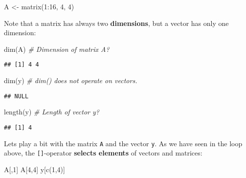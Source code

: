 \documentclass[
]{book}
\newenvironment{Shaded}{\begin{snugshade}}{\end{snugshade}}
\newcommand{\CommentTok}[1]{\textcolor[rgb]{0.56,0.35,0.01}{\textit{#1}}}
\newcommand{\DecValTok}[1]{\textcolor[rgb]{0.00,0.00,0.81}{#1}}
\newcommand{\FunctionTok}[1]{\textcolor[rgb]{0.00,0.00,0.00}{#1}}
\newcommand{\NormalTok}[1]{#1}
\newcommand{\OtherTok}[1]{\textcolor[rgb]{0.56,0.35,0.01}{#1}}
\newcommand{\SpecialCharTok}[1]{\textcolor[rgb]{0.00,0.00,0.00}{#1}}
\begin{document}
\begin{Shaded}
\begin{Highlighting}[]
\NormalTok{A }\OtherTok{\textless{}{-}} \FunctionTok{matrix}\NormalTok{(}\DecValTok{1}\SpecialCharTok{:}\DecValTok{16}\NormalTok{, }\DecValTok{4}\NormalTok{, }\DecValTok{4}\NormalTok{)}
\end{Highlighting}
\end{Shaded}

Note that a matrix has always two \textbf{dimensions}, but a vector has only one dimension:

\begin{Shaded}
\begin{Highlighting}[]
\FunctionTok{dim}\NormalTok{(A)    }\CommentTok{\# Dimension of matrix A?}
\end{Highlighting}
\end{Shaded}

\begin{verbatim}
## [1] 4 4
\end{verbatim}

\begin{Shaded}
\begin{Highlighting}[]
\FunctionTok{dim}\NormalTok{(y)    }\CommentTok{\# dim() does not operate on vectors.}
\end{Highlighting}
\end{Shaded}

\begin{verbatim}
## NULL
\end{verbatim}

\begin{Shaded}
\begin{Highlighting}[]
\FunctionTok{length}\NormalTok{(y) }\CommentTok{\# Length of vector y?}
\end{Highlighting}
\end{Shaded}

\begin{verbatim}
## [1] 4
\end{verbatim}

Lets play a bit with the matrix \texttt{A} and the vector \texttt{y}. As we have seen in the loop above, the \texttt{{[}{]}}-operator \textbf{selects elements} of vectors and matrices:

\begin{Shaded}
\begin{Highlighting}[]
\NormalTok{A[,}\DecValTok{1}\NormalTok{]}
\NormalTok{A[}\DecValTok{4}\NormalTok{,}\DecValTok{4}\NormalTok{]}
\NormalTok{y[}\FunctionTok{c}\NormalTok{(}\DecValTok{1}\NormalTok{,}\DecValTok{4}\NormalTok{)]}
\end{Highlighting}
\end{Shaded}
\end{document}
